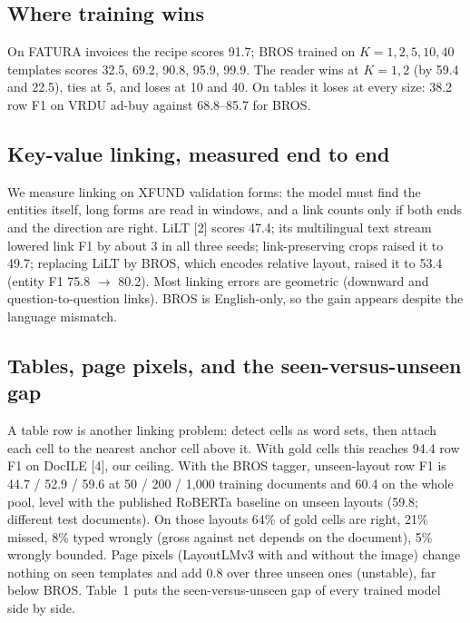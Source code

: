 \documentclass[10pt,a4paper]{article}
\begin{document}
\subsection{Where training wins}
On FATURA invoices the recipe scores 91.7; BROS trained on $K = 1, 2, 5, 10, 40$ templates scores 32.5, 69.2, 90.8, 95.9, 99.9. The reader wins at $K = 1, 2$ (by 59.4 and 22.5), ties at 5, and loses at 10 and 40. On tables it loses at every size: 38.2 row F1 on VRDU ad-buy against 68.8--85.7 for BROS.

\subsection{Key-value linking, measured end to end}
We measure linking on XFUND validation forms: the model must find the entities itself, long forms are read in windows, and a link counts only if both ends and the direction are right. LiLT [2] scores 47.4; its multilingual text stream lowered link F1 by about 3 in all three seeds; link-preserving crops raised it to 49.7; replacing LiLT by BROS, which encodes relative layout, raised it to 53.4 (entity F1 75.8 $\to$ 80.2). Most linking errors are geometric (downward and question-to-question links). BROS is English-only, so the gain appears despite the language mismatch.

\subsection{Tables, page pixels, and the seen-versus-unseen gap}
A table row is another linking problem: detect cells as word sets, then attach each cell to the nearest anchor cell above it. With gold cells this reaches 94.4 row F1 on DocILE [4], our ceiling. With the BROS tagger, unseen-layout row F1 is 44.7 / 52.9 / 59.6 at 50 / 200 / 1,000 training documents and 60.4 on the whole pool, level with the published RoBERTa baseline on unseen layouts (59.8; different test documents). On those layouts 64\% of gold cells are right, 21\% missed, 8\% typed wrongly (gross against net depends on the document), 5\% wrongly bounded. Page pixels (LayoutLMv3 with and without the image) change nothing on seen templates and add 0.8 over three unseen ones (unstable), far below BROS. Table~1 puts the seen-versus-unseen gap of every trained model side by side.
\end{document}
